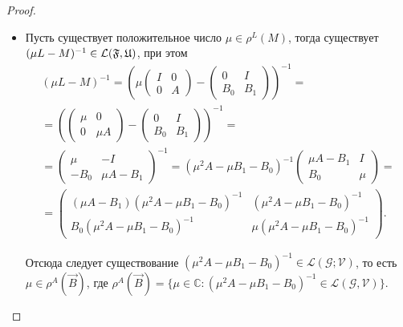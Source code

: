 \begin{proof}
\begin{itemize}
\item[(ii)] Пусть существует положительное число $\mu\in\rho^{L}(M)$,
тогда существует $(\mu
L-M)^{-1}\in\mathcal{L}(\frak{F},\frak{U})$, при этом
\begin{multline*}
(\mu L-M)^{-1}=\left(\mu \begin{pmatrix}
I&0\\0&A\end{pmatrix}-\begin{pmatrix}
0&I\\B_{0}&B_{1}\end{pmatrix}\right)^{-1}= \\ = \left(
\begin{pmatrix} \mu&0\\0&\mu A\end{pmatrix}-\begin{pmatrix}
0&I\\B_{0}&B_{1}\end{pmatrix}\right)^{-1}=
\\
=\begin{pmatrix} \mu&-I\\-B_{0}&\mu
A-B_{1}\end{pmatrix}^{-1}=(\mu^{2}A-\mu
B_{1}-B_{0})^{-1}\begin{pmatrix} \mu
A-B_{1}&I\\B_{0}&\mu\end{pmatrix}=
\\
=\begin{pmatrix} (\mu A-B_{1})(\mu^{2}A-\mu
B_{1}-B_{0})^{-1}&(\mu^{2}A-\mu
B_{1}-B_{0})^{-1}\\B_{0}(\mu^{2}A-\mu B_{1}-B_{0})^{-1}&\mu
(\mu^{2}A-\mu B_{1}-B_{0})^{-1}\end{pmatrix}.
\end{multline*}

Отсюда следует существование $(\mu^{2}A-\mu
B_{1}-B_{0})^{-1}\in\mathcal L (\mathcal G;\mathcal
 V)$, то есть $\mu\in\rho^{A}(\vec{B})$, где $\rho^{A}(\vec{B})=\{\mu\in\mathbb{C}:(\mu^{2}A-\mu B_{1}-B_{0})^{-1}\in\mathcal{L}(\mathcal{G},\mathcal{V})\}$.


\end{itemize}
\end{proof}
